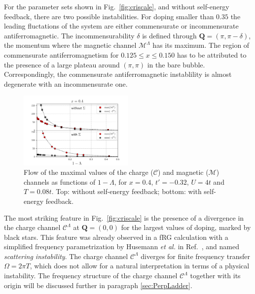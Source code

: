 For the parameter sets shown in Fig.~\ref{fig:criscale}, and without self-energy feedback, there are two possible instabilities. 
For doping smaller than $0.35$ the leading fluctations of the system are either commensurate or incommensurate antiferromagnetic.
The incommensurability $\delta$ is defined through $\mathbf{Q}=(\pi,\pi-\delta)$, the momentum where the magnetic channel $\mathcal{M}^\Lambda$ has its maximum. 
The region of commensurate antiferromagnetism for $0.125\le x \le 0.150$ has to be attributed to the presence of a large plateau around $(\pi,\pi)$ in the bare bubble. Correspondingly, the commensurate antiferromagnetic instablility is almost degenerate with an incommensurate one.
%
\begin{figure}
\includegraphics[width=0.50\textwidth]{images/chargeproblem_MC_vs_Lambda_fix_occ.png}
\caption{Flow of the maximal values of the charge ($\mathcal{C}$) and magnetic ($\mathcal{M}$) channels as functions of $1-\Lambda$, for  $x=0.4$, $t'=-0.32$, $U=4t$ and $T=0.08t$.  Top: without self-energy feedback; bottom: with self-energy feedback. }
\label{fig:chargeproblem}
\end{figure}
%

The most striking feature in Fig.~\ref{fig:criscale} is the presence of a divergence in the charge channel $\mathcal{C}^\Lambda$ at $\mathbf{Q}=(0,0)$ for the largest values of doping, marked by black stars. 
This feature was already observed in a fRG calculation with a simplified frequency parametrization by Husemann \textit{et al.} in Ref.~, and named \textit{scattering instability}. 
The charge channel $\mathcal{C}^\Lambda$ diverges for finite frequency transfer $\Omega=2\pi T$, which does not allow for a natural interpretation in terms of a physical instability. 
The frequency structure of the charge channel $\mathcal{C}^\Lambda$ together with its origin will be discussed further in paragraph \ref{sec:PerpLadder}.

